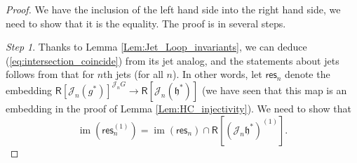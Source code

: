 \documentclass{amsart}
\theoremstyle{definition}
\newcommand{\Ring}{\mathsf{R}}
\newcommand{\h}{\mathfrak{h}}
\newcommand{\Jet}{\mathscr{J}}
\numberwithin{equation}{section}
\begin{document}
\begin{proof}
We have the inclusion of the left hand side into the right hand side, we need to show that it is the equality. The proof is in several steps.

{\it Step 1}.
Thanks to Lemma \ref{Lem:Jet_Loop_invariants}, we can deduce (\ref{eq:intersection_coincide}) from its jet analog, and the statements about jets follows from that for $n$th jets 
(for all $n$). In other words, let $\mathsf{res}_n$ denote the embedding $\Ring[\Jet_n(g^*)]^{\Jet_n G}\rightarrow \Ring[\Jet_n(\h^*)]$ (we have seen that this map is an embedding in the proof of Lemma \ref{Lem:HC_injectivity}). We need to show that 
\begin{equation}\label{eq:intersection_coincide_n}
\operatorname{im}(\mathsf{res}_n^{(1)})=\operatorname{im}(\mathsf{res}_n)\cap \Ring[(\Jet_n \h^*)^{(1)}].
\end{equation}


\end{proof}
\end{document}
